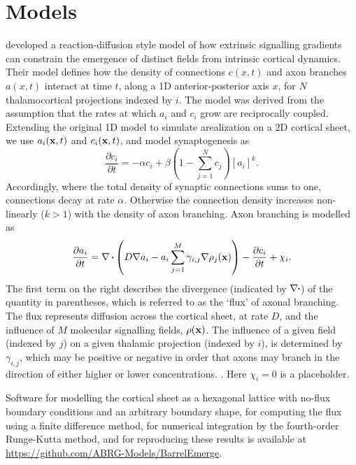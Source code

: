 \documentclass[9pt,lineno]{elife}
\begin{document}
\section{Models}

\cite{karbowski_model_2004} developed a reaction-diffusion style model of how
extrinsic signalling gradients can constrain the emergence of distinct fields
from intrinsic cortical dynamics. Their model defines how the density of
connections $c(x,t)$ and axon branches $a(x,t)$ interact at time $t$, along a
1D anterior-posterior axis $x$, for $N$ thalamocortical projections indexed by
$i$. The model was derived from the assumption that the rates at which $a_i$
and $c_i$ grow are reciprocally coupled. Extending the original 1D model to
simulate arealization on a 2D cortical sheet, we use $a_i(\mathbf{x},t)$ and
$c_i(\mathbf{x},t)$, and model synaptogenesis as
%
\begin{equation} \label{eq:dc}
\frac{\partial c_i}{\partial t} =-\alpha c_i +\beta  \left(1 - \sum_{j=1}^{N} c_{j}\right)[a_i]^k.
\end{equation}
%
Accordingly, where the total density of synaptic connections sums to one,
connections decay at rate $\alpha$. Otherwise the connection density increases
non-linearly ($k>1$) with the density of axon branching. Axon branching is
modelled as
%
\begin{equation} \label{eq:da}
\frac{\partial a_i}{\partial t} = \nabla\vcdot\left(D \nabla a_i-a_i\sum_{j=1}^{M} \gamma_{i,j}\nabla \rho_j(\mb{x})\right) - \frac{\partial c_i}{\partial t} + \chi_i.
\end{equation}
%
The first term on the right describes the divergence (indicated by
$\nabla\vcdot$) of the quantity in parentheses, which is referred to as the
`flux' of axonal branching. The flux represents diffusion across the cortical
sheet, at rate $D$, and the influence of $M$ molecular signalling fields,
$\rho(\mathbf{x})$. The influence of a given field (indexed by $j$) on a given
thalamic projection (indexed by $i$), is determined by $\gamma_{i,j}$, which
may be positive or negative in order that axons may branch in the direction of
either higher or lower concentrations. . Here $\chi_i=0$ is a placeholder.

Software for modelling the cortical sheet as a hexagonal lattice with no-flux
boundary conditions and an arbitrary boundary shape, for computing the flux
using a finite difference method, for numerical integration by the
fourth-order Runge-Kutta method, and for reproducing these results is
available at \url{https://github.com/ABRG-Models/BarrelEmerge}.
\end{document}
